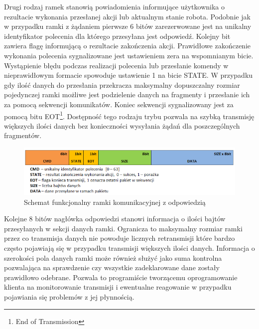 Drugi rodzaj ramek stanowią powiadomienia informujące użytkownika o rezultacie 
wykonania przesłanej akcji lub aktualnym stanie robota. Podobnie jak w przypadku
ramki z żądaniem pierwsze 6 bitów zarezerwowane jest na unikalny identyfikator
polecenia dla którego przesyłana jest odpowiedź. Kolejny bit zawiera flagę
informującą o rezultacie zakończenia akcji. Prawidłowe zakończenie wykonania
polecenia sygnalizowane jest ustawieniem zera na wspomnianym bicie. Wystąpienie
błędu podczas realizacji polecenia lub przesłanie komendy w nieprawidłowym
formacie spowoduje ustawienie 1 na bicie STATE. W przypadku gdy ilość
danych do przesłania przekracza maksymalny dopuszczalny rozmiar
pojedynczej ramki możliwe jest podzielenie danych na fragmenty i przesłanie ich
za pomocą sekwencji komunikatów. Koniec sekwencji sygnalizowany jest za pomocą
bitu EOT\footnote{End of Transmission}. Dostępność tego rodzaju trybu pozwala
na szybką transmisję większych ilości danych bez konieczności wysyłania żądań dla poszczególnych fragmentów.

\begin{figure}[h!] 
 \centering
 \includegraphics[width=\textwidth]{../images/ch05/resp_schema2.png}
 \caption{Schemat funkcjonalny ramki komunikacyjnej z odpowiedzią}
 \label{fig:RfcommRespFrame}
\end{figure}

Kolejne 8 bitów nagłówka odpowiedzi stanowi informacja o ilości bajtów
przesyłanych w sekcji danych ramki. Ogranicza to maksymalny rozmiar ramki przez
co transmisja danych nie powoduje licznych retransmisji które bardzo często
pojawiają się w przypadku transmisji większych ilości danych. Informacja o
szerokości pola danych ramki może również służyć jako suma kontrolna pozwalająca
na sprawdzenie czy wszystkie zadeklarowane dane zostały prawidłowo odebrane.
Pozwala to programiście tworzącemu oprogramowanie klienta na monitorowanie
transmisji i ewentualne reagowanie w przypadku pojawiania się problemów z
jej płynnością.

